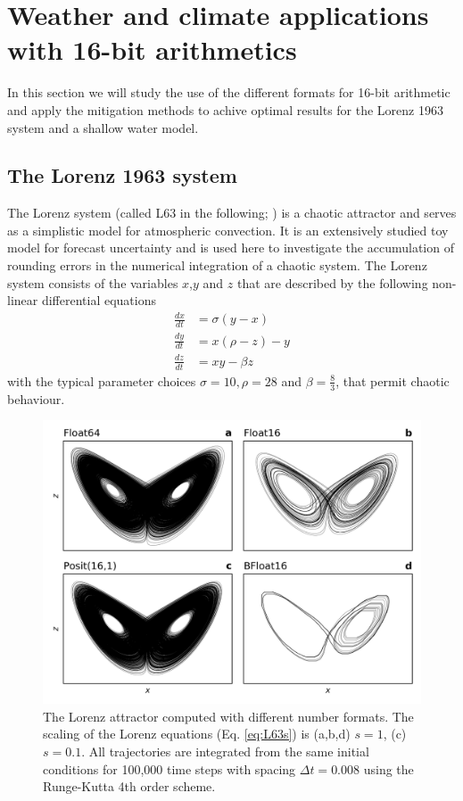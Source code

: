 \documentclass[draft]{agujournal2019}
\begin{document}
\section{Weather and climate applications with 16-bit arithmetics}
\label{sec:runs}

In this section we will study the use of the different formats for 16-bit arithmetic and apply the mitigation methods to achive optimal results for the Lorenz 1963 system and a shallow water model.

\subsection{The Lorenz 1963 system}
\label{sec:L63}

The Lorenz system (called L63 in the following; \cite{Lorenz1963}) is a chaotic attractor and serves as a simplistic model for atmospheric convection. It is an extensively studied toy model for forecast uncertainty \cite{Lorenz1963,Kwasniok2014,Jeffress2017,Tantet2018} and is used here to investigate the accumulation of rounding errors in the numerical integration of a chaotic system. The Lorenz system consists of the variables $x$,$y$ and $z$ that are described by the following non-linear differential equations
\begin{subequations}
\begin{align}
\frac{dx}{dt} &= \sigma(y-x) \\
\frac{dy}{dt} &= x(\rho - z) - y \\
\frac{dz}{dt} &= xy - \beta z
\end{align}
\label{eq:L63}%
\end{subequations}
with the typical parameter choices $\sigma = 10, \rho = 28$ and $\beta = \tfrac{8}{3}$, that permit chaotic behaviour.

\begin{figure}
\includegraphics[width=1\textwidth]{lorenz_attractor.png}
\caption{The Lorenz attractor computed with different number formats. The scaling of the Lorenz equations (Eq. \ref{eq:L63s}) is (a,b,d) $s=1$, (c) $s=0.1$. All trajectories are integrated from the same initial conditions for 100,000 time steps with spacing $\Delta t = 0.008$ using the Runge-Kutta 4th order scheme.}
\label{fig:L63}
\end{figure}
\end{document}
